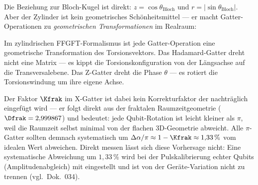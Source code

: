 Die Beziehung zur Bloch-Kugel ist direkt:
$z = \cos\theta_\text{Bloch}$ und $r = |\sin\theta_\text{Bloch}|$.
Aber der Zylinder ist kein geometrisches Schönheitsmittel ---
er macht Gatter-Operationen zu \emph{geometrischen
Transformationen} im Realraum:

\begin{center}
\end{center}

\begin{foundation}
Im zylindrischen FFGFT-Formalismus ist jede Gatter-Operation
eine geometrische Transformation des Torsionsvektors.
Das Hadamard-Gatter dreht nicht eine Matrix ---
es kippt die Torsionskonfiguration von der
Längsachse auf die Transversalebene.
Das Z-Gatter dreht die Phase $\theta$ ---
es rotiert die Torsionswindung um ihre eigene Achse.

Der Faktor $\Kfrak$ im X-Gatter ist dabei
kein Korrekturfaktor der nachträglich eingefügt wird ---
er folgt direkt aus der fraktalen Raumzeitgeometrie
($\Dfrak = 2{,}999867$) und bedeutet:
jede Qubit-Rotation ist leicht kleiner als $\pi$,
weil die Raumzeit selbst minimal von der flachen
3D-Geometrie abweicht.
Alle $\pi$-Gatter sollten demnach systematisch um
$\Delta\alpha/\pi \approx 1 - \Kfrak \approx 1{,}33\,\%$ vom idealen Wert abweichen.
Direkt messen lässt sich diese Vorhersage nicht: Eine systematische Abweichung um $1{,}33\,\%$ wird bei der Pulskalibrierung echter Qubits (Amplitudenabgleich) mit eingestellt und ist von der Geräte-Variation nicht zu trennen (vgl.\ Dok.~034).
\end{foundation}


